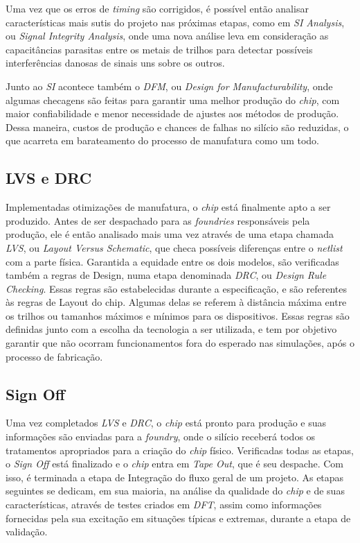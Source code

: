 \documentclass[
	12pt,				%
    oneside,			%
	a4paper,			%
	english,			%
	french,				%
	spanish,			%
	brazil				%
	]{abntex2}
\begin{document}
Uma vez que os erros de \textit{timing} são corrigidos, é possível então analisar características mais sutis do projeto nas próximas etapas, como em \textit{SI Analysis}, ou \textit{Signal Integrity Analysis}, onde uma nova análise leva em consideração as capacitâncias parasitas entre os metais de trilhos para detectar possíveis interferências danosas de sinais uns sobre os outros.

Junto ao \textit{SI} acontece também o \textit{DFM}, ou \textit{Design for Manufacturability}, onde algumas checagens são feitas para garantir uma melhor produção do \textit{chip}, com maior confiabilidade e menor necessidade de ajustes aos métodos de produção. Dessa maneira, custos de produção e chances de falhas no silício são reduzidas, o que acarreta em barateamento do processo de manufatura como um todo.

\subsection{LVS e DRC}

Implementadas otimizações de manufatura, o \textit{chip} está finalmente apto a ser produzido. Antes de ser despachado para as \textit{foundries} responsáveis pela produção, ele é então analisado mais uma vez através de uma etapa chamada \textit{LVS}, ou \textit{Layout Versus Schematic}, que checa possíveis diferenças entre o \textit{netlist} com a parte física. Garantida a equidade entre os dois modelos, são verificadas também a regras de Design, numa etapa denominada \textit{DRC}, ou \textit{Design Rule Checking}. Essas regras são estabelecidas durante a especificação, e são referentes às regras de Layout do chip. Algumas delas se referem à distância máxima entre os trilhos ou tamanhos máximos e mínimos para os dispositivos. Essas regras são definidas junto com a escolha da tecnologia a ser utilizada, e tem por objetivo garantir que não ocorram funcionamentos fora do esperado nas simulações, após o processo de fabricação.

\subsection{Sign Off}

Uma vez completados \textit{LVS} e \textit{DRC}, o \textit{chip} está pronto para produção e suas informações são enviadas para a \textit{foundry}, onde o silício receberá todos os tratamentos apropriados para a criação do \textit{chip} físico. Verificadas todas as etapas, o \textit{Sign Off} está finalizado e o \textit{chip} entra em \textit{Tape Out}, que é seu despache. Com isso, é terminada a etapa de Integração do fluxo geral de um projeto. As etapas seguintes se dedicam, em sua maioria, na análise da qualidade do \textit{chip} e de suas características, através de testes criados em \textit{DFT}, assim como informações fornecidas pela sua excitação em situações típicas e extremas, durante a etapa de validação.
\end{document}
